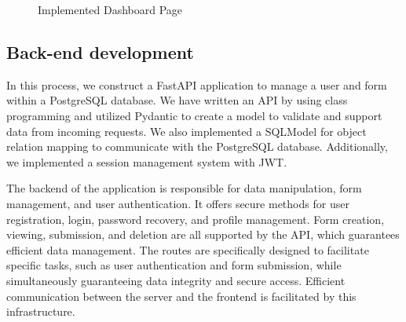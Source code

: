 \documentclass[12pt,oneside,openright,a4paper]{cpe-english-project}
\begin{document}
\begin{figure}[H]
\centering
{}
\caption{Implemented Dashboard Page}\label{fig:dashboard-result}
\end{figure}

\subsection{Back-end development}

In this process, we construct a FastAPI application to manage a user and form within a PostgreSQL database. We have written an API by using class programming and utilized Pydantic to create a model to validate and support data from incoming requests. We also implemented a SQLModel for object relation mapping to communicate with the PostgreSQL database. Additionally, we implemented a session management system with JWT.

The backend of the application is responsible for data manipulation, form management, and user authentication. It offers secure methods for user registration, login, password recovery, and profile management. Form creation, viewing, submission, and deletion are all supported by the API, which guarantees efficient data management. The routes are specifically designed to facilitate specific tasks, such as user authentication and form submission, while simultaneously guaranteeing data integrity and secure access. Efficient communication between the server and the frontend is facilitated by this infrastructure.
\end{document}
